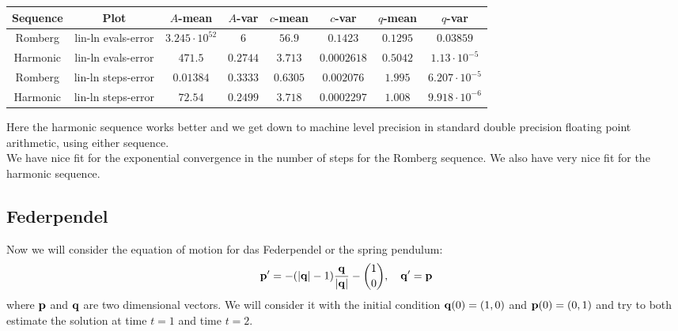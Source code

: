 \begin{table}[H]
    \centering
    \small
     \begin{tabular}{c|c||c|c|c|c|c|c}
Sequence & Plot & \(A\)-mean & \(A\)-var & \(c\)-mean & \(c\)-var & \(q\)-mean & \(q\)-var\\\hline
\rowcolor{red}
Romberg & lin-ln evals-error & \(3.245\cdot 10^{52}\) & \(6\) & \(56.9\) & \(0.1423\) & \(0.1295\) & \(0.03859\) \\
\rowcolor{green}
Harmonic & lin-ln evals-error & \(471.5\) & \(0.2744\) & \(3.713\) & \(0.0002618\) & \(0.5042\) & \(1.13\cdot 10^{-5}\) \\
\rowcolor{green}
Romberg & lin-ln steps-error & \(0.01384\) & \(0.3333\) & \(0.6305\) & \(0.002076\) & \(1.995\) & \(6.207\cdot 10^{-5}\) \\
\rowcolor{green}
Harmonic & lin-ln steps-error & \(72.54\) & \(0.2499\) & \(3.718\) & \(0.0002297\) & \(1.008\) & \(9.918\cdot 10^{-6}\) \\
    \end{tabular}
    \label{tab:my_label}
\end{table}

Here the harmonic sequence works better and we get down to machine level precision in standard double precision floating point arithmetic, using either sequence.\\

We have nice fit for the exponential convergence in the number of steps for the Romberg sequence. We also have very nice fit for the harmonic sequence.

\subsection{Federpendel}

Now we will consider the equation of motion for das Federpendel or the spring pendulum:
\[
\mathbf{p}' = -(|\mathbf{q}| - 1)\frac{\mathbf{q}}{|\mathbf{q}|} - {1\choose 0}, \quad \mathbf{q}' = \mathbf{p}
\]
where \(\mathbf{p}\) and \(\mathbf{q}\) are two dimensional vectors. We will consider it with the initial condition \(\mathbf{q}(0) = (1,0)\) and \(\mathbf{p}(0) = (0,1)\) and try to both estimate the solution at time \(t = 1\) and time \(t = 2\).

